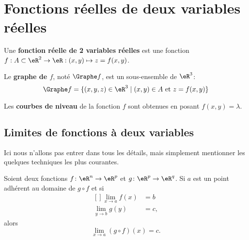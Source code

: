 \section{Fonctions réelles de deux variables réelles}

Une \textbf{fonction réelle de 2 variables réelles} est une fonction $f : A \subset \eR^2 \to \eR : (x,y) \mapsto z = f(x,y)$.

Le \textbf{graphe de $f$}, noté $\Graphe f$, est un sous-ensemble de $\eR^3$:\[\Graphe f = \{(x,y,z) \in \eR^3 \mid (x,y) \in A \text{ et } z = f(x,y)\}\]

Les \textbf{courbes de niveau} de la fonction $f$ sont obtenues en posant $f(x,y)=\lambda$.

\subsection{Limites de fonctions à deux variables}

Ici nous n'allons pas entrer dans tous les détails, mais simplement mentionner les quelques techniques les plus courantes. 

\begin{theorem}		\label{ThoLimiteCompose}
	Soient deux fonctions $f\colon \eR^n\to \eR^p$ et $g\colon \eR^p\to \eR^q$. Si $a$ est un point adhérent au domaine de $g\circ f$ et si
	\begin{equation}
		\begin{aligned}[]
			\lim_{x\to a}f(x)&=b\\
			\lim_{y\to b}g(y)&=c,
		\end{aligned}
	\end{equation}
	alors 
	\begin{equation}
		\lim_{x\to a}(g\circ f)(x)=c.
	\end{equation}
\end{theorem}


